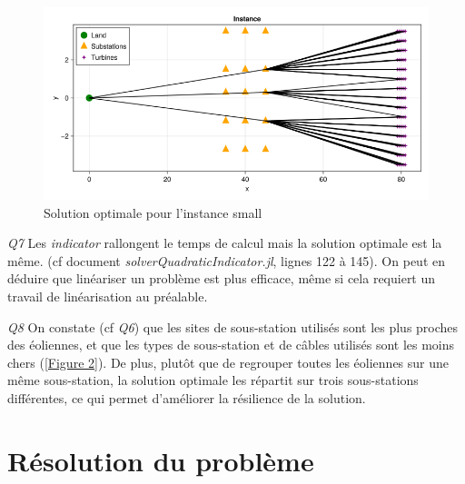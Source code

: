 \documentclass[a4paper,12pt]{article}
\begin{document}
\begin{figure}[h]
    \centering
    \includegraphics[scale=0.2]{small.png}
    \caption{Solution optimale pour l'instance small}
    \label{Figure 1}
\end{figure}

\textit{Q7} Les \textit{indicator} rallongent le temps de calcul mais la solution optimale est la même. (cf document \textit{solverQuadraticIndicator.jl}, lignes 122 à 145). On peut en déduire que linéariser un problème est plus efficace, même si cela requiert un travail de linéarisation au préalable.

\textit{Q8}
On constate (cf \textit{Q6}) que les sites de sous-station utilisés sont les plus proches des éoliennes, et que les types de sous-station et de câbles utilisés sont les moins chers (\ref{Figure 2}).
De plus, plutôt que de regrouper toutes les éoliennes sur une même sous-station, la solution optimale les répartit sur trois sous-stations différentes, ce qui permet d'améliorer la résilience de la solution.

\section {Résolution du problème}
\end{document}
